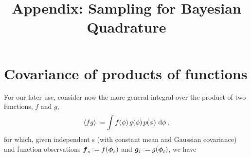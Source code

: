 \documentclass{article}
\title{Appendix: Sampling for Bayesian Quadrature}
\begin{document}
 

\section{Covariance of products of functions}
For our later use, consider now the more general integral over the product of two functions, $f$ and $g$,
$$\inty{f g} \deq \int f(\phi)\,g(\phi)\,\po{\phi}\,\ud\phi\,,$$ 
for which, given independent \gp s (with constant mean and Gaussian covariance) and function observations $\vf_{s} \deq f(\vph_{s})$ and  $\vg_{t} \deq g(\vph_{t})$, we have
% 
\end{document}

